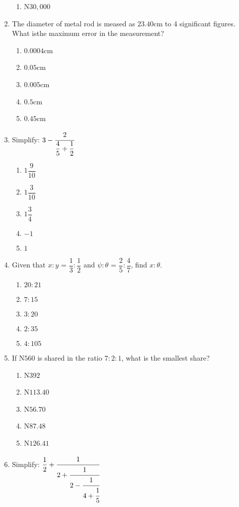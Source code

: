 \begin{multicols}{2}
\begin{enumerate}[label={\arabic*.}]
\begin{enumerate}[label={\Alph*.}]
    \item N\(30,000\)
    \end{enumerate}
\item The diameter of metal rod is meased as \(23.40\)cm to 4 significant figures. What isthe maximum error in the measurement?
    \begin{enumerate}[label={\Alph*.}]
    \item \(0.0004\)cm
    \item \(0.05\)cm
    \item \(0.005\)cm
    \item \(0.5\)cm
    \item \(0.45\)cm
    \end{enumerate}
\item Simplify: \(3 - {\cfrac{2}{\dfrac{4}{5} + \dfrac{1}{2}}}\)
    \begin{enumerate}[label={\Alph*.}]
    \item \(1\dfrac{9}{10}\)
    \item \(1\dfrac{3}{10}\)
    \item \(1\dfrac{3}{4}\)
    \item \(-1\)
    \item \(1\)
    \end{enumerate}
\item Given that \(x:y\) = \(\dfrac{1}{3}:\dfrac{1}{2}\) and \(\psi:\theta\) = \(\dfrac{2}{5}:\dfrac{4}{7}\), find \(x:\theta\).
    \begin{enumerate}[label={\Alph*.}]
    \item \(20:21\)
    \item \(7:15\)
    \item \(3:20\)
    \item \(2:35\)
    \item \(4:105\)
    \end{enumerate}
\item If N\(560\) is shared in the ratio \(7:2:1\), what is the smallest share?
    \begin{enumerate}[label={\Alph*.}]
    \item N\(392\)
    \item N\(113.40\)
    \item N\(56.70\)
    \item N\(87.48\)
    \item N\(126.41\)
    \end{enumerate}
\item Simplify: \(\dfrac{1}{2} + \cfrac{1}{2 + \cfrac{1}{2 - \cfrac{1}{4 + \cfrac{1}{5}}}}\)

\end{enumerate}
\end{multicols}
